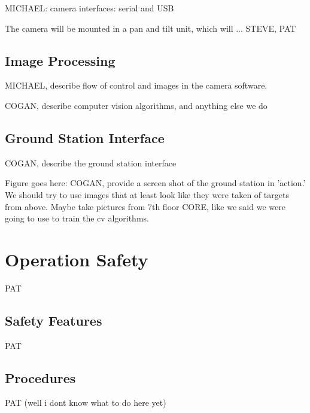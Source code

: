 \documentclass[10pt]{report}
\begin{document}
MICHAEL: camera interfaces: serial and USB 

The camera will be mounted in a pan and tilt unit, which will ... STEVE, PAT

\subsection{Image Processing}
MICHAEL, describe flow of control and images in the camera software.

COGAN, describe computer vision algorithms, and anything else we do

\subsection{Ground Station Interface}

COGAN, describe the ground station interface

Figure goes here: COGAN, provide a screen shot of the ground station in 'action.' We should try to use images that at least look like they were taken of targets from above. Maybe take pictures from 7th floor CORE, like we said we were going to use to train the cv algorithms.

\section{Operation Safety}

PAT

\subsection{Safety Features}

PAT

\subsection{Procedures}

PAT (well i dont know what to do here yet)



\end{document}
